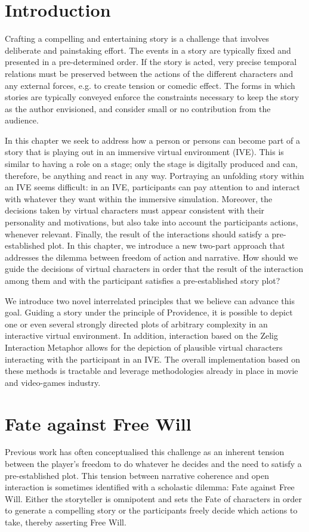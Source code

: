 \documentclass[
		twoside,openright,titlepage,numbers=noenddot,manychapters,
		headinclude,%
                footinclude=false,cleardoublepage=empty,
                BCOR=5mm,
		fontsize=11pt, %
                 enabledeprecatedfontcommands]{scrreprt}
\begin{document}
\section{Introduction} 

Crafting a compelling and entertaining story is a challenge that involves deliberate and painstaking effort. The events in a story are typically fixed and presented in a pre-determined order. If the story is acted, very precise temporal relations must be preserved between the actions of the different characters and any external forces, e.g. to create tension or comedic effect. The forms in which stories are typically conveyed enforce the constraints necessary to keep the story as the author envisioned, and consider small or no contribution from the audience. 

In this chapter we seek to address how a person or persons can become part of a story that is playing out in an immersive virtual environment (IVE). This is similar to having a role on a stage; only the stage is digitally produced and can, therefore, be anything and react in any way. Portraying an unfolding story within an IVE seems difficult: in an IVE, participants can pay attention to and interact with whatever they want within the immersive simulation. Moreover, the decisions taken by virtual characters must appear consistent with their personality and motivations, but also take into account the participants actions, whenever relevant. Finally, the result of the interactions should satisfy a pre-established plot. In this chapter, we introduce a new two-part approach that addresses the dilemma between freedom of action and narrative. How should we guide the decisions of virtual characters in order that the result of the interaction among them and with the participant satisfies a pre-established story plot?

We introduce two novel interrelated principles that we believe can advance this goal. Guiding a story under the principle of Providence, it is possible to depict one or even several strongly directed plots of arbitrary complexity in an interactive virtual environment. In addition, interaction based on the Zelig Interaction Metaphor allows for the depiction of plausible virtual characters interacting with the participant in an IVE. The overall implementation based on these methods is tractable and leverage methodologies already in place in movie and video-games industry. 

 
\section{Fate against Free Will}
Previous work has often conceptualised this challenge as an inherent tension between the player's freedom to do whatever he decides and the need to satisfy a pre-established plot. This tension between narrative coherence and open interaction is sometimes identified with a scholastic dilemma: Fate against Free Will. Either the storyteller is omnipotent and sets the Fate of characters in order to generate a compelling story or the participants freely decide which actions to take, thereby asserting Free Will. 
\end{document}
